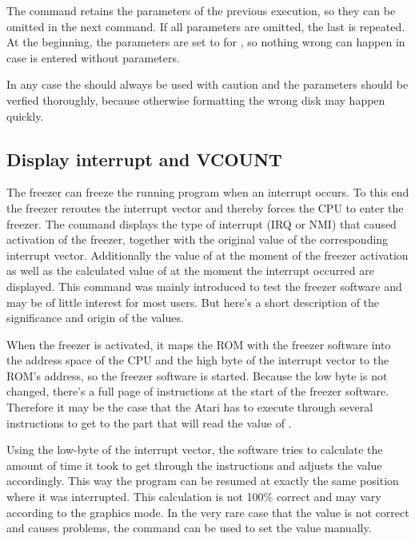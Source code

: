 The  command retains the parameters of the previous
execution, so they can be omitted in the next  command. If all
parameters are omitted, the last  is repeated. At the beginning, the
parameters are set to  for , so nothing wrong can
happen in case  is entered without parameters.

In any case the
 should always be used with caution and the parameters should be
verfied thoroughly, because otherwise formatting the wrong disk may happen
quickly.

\subsection{Display interrupt and VCOUNT}
The freezer can freeze the running program when an interrupt occurs.
To this end the freezer reroutes the interrupt vector and thereby forces the CPU
to enter the freezer. The  command displays the type of interrupt (IRQ
or NMI) that caused activation of the freezer, together with the original value
of the corresponding interrupt vector. Additionally the value of 
at the moment of the freezer activation as well as the calculated value of
 at the moment the interrupt occurred are displayed. This command
was mainly introduced to test the freezer software and may be of little interest
for most users. But here's a short description of the significance and origin of
the values.

When the freezer is activated, it maps the ROM with the freezer software into
the address space of the CPU and  the high byte of the interrupt
vector to the ROM's address, so the freezer software is started.
Because the low byte is not changed, there's a full page of 
instructions at the start of the freezer software. Therefore it may be the case
that the Atari has to execute through several  instructions to get to
the part that will read the value of .

Using the low-byte of the interrupt vector, the software tries to calculate the
amount of time it took to get through the  instructions and adjusts the
 value accordingly. This way the program can be resumed at exactly
the same position where it was interrupted. This calculation is not 100\%
correct and may vary according to the graphics mode. In the very rare case that
the value is not correct and causes problems, the command 
 can be used to set the  value manually.

